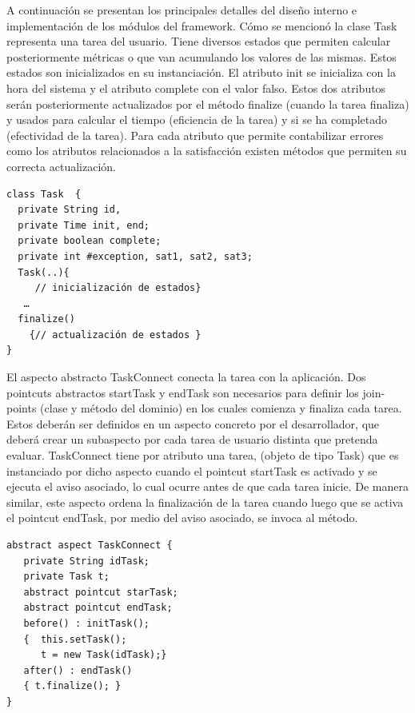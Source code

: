 A continuación se presentan los principales detalles del diseño interno e implementación de los módulos del framework. Cómo se mencionó la clase Task representa una tarea del usuario. Tiene diversos estados que permiten calcular posteriormente métricas o que van acumulando los valores de las mismas. Estos estados son inicializados en su instanciación. El atributo init se inicializa con la hora del sistema y el atributo complete con el valor falso. Estos dos atributos serán posteriormente actualizados por el método finalize (cuando la tarea finaliza) y usados para calcular el tiempo (eficiencia de la tarea) y si se ha completado (efectividad de la tarea). Para cada atributo que permite contabilizar errores como los atributos relacionados a la satisfacción existen métodos que permiten su correcta actualización. 
\squeezeup
\begin{verbatim}
class Task  {
  private String id,
  private Time init, end;
  private boolean complete;
  private int #exception, sat1, sat2, sat3;
  Task(..){
     // inicialización de estados}
   …
  finalize()
    {// actualización de estados }
}
\end{verbatim}
\squeezeup

El aspecto abstracto TaskConnect conecta la tarea con la aplicación. Dos pointcuts abstractos startTask y endTask son necesarios para definir los join-points (clase y método del dominio)  en los cuales comienza y finaliza cada tarea. Estos deberán ser definidos en un aspecto concreto por el desarrollador, que deberá crear un subaspecto por cada tarea de usuario distinta que pretenda evaluar. TaskConnect  tiene por atributo una tarea, (objeto  de tipo Task) que es instanciado por dicho aspecto cuando el pointcut startTask es activado y se ejecuta el aviso asociado, lo cual ocurre antes de que cada tarea inicie. De manera similar, este aspecto ordena la finalización de la tarea cuando luego que se activa el pointcut endTask, por medio del aviso asociado, se invoca al método.  
\squeezeup
\begin{verbatim}
abstract aspect TaskConnect {
   private String idTask;
   private Task t;
   abstract pointcut starTask; 
   abstract pointcut endTask;
   before() : initTask();
   {  this.setTask();
      t = new Task(idTask);}
   after() : endTask()
   { t.finalize(); }
}
\end{verbatim}
\squeezeup

